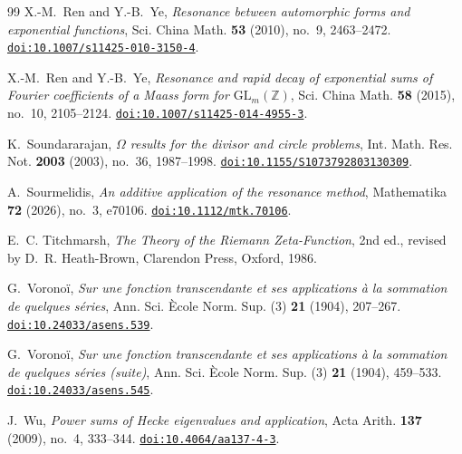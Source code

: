 \documentclass[11pt]{amsart}
\theoremstyle{plain}
\theoremstyle{definition}
\theoremstyle{remark}
\newcommand{\doi}[1]{\href{https://doi.org/#1}{\nolinkurl{doi:#1}}}
\numberwithin{equation}{section}
\begin{document}
\begin{thebibliography}{99}
X.-M.~Ren and Y.-B.~Ye,
\emph{Resonance between automorphic forms and exponential functions},
Sci. China Math. \textbf{53} (2010), no.~9, 2463--2472.
\doi{10.1007/s11425-010-3150-4}.

X.-M.~Ren and Y.-B.~Ye,
\emph{Resonance and rapid decay of exponential sums of Fourier
coefficients of a Maass form for
$\mathrm{GL}_m(\mathbb Z)$},
Sci. China Math. \textbf{58} (2015), no.~10, 2105--2124.
\doi{10.1007/s11425-014-4955-3}.

K.~Soundararajan,
\emph{$\Omega$ results for the divisor and circle problems},
Int. Math. Res. Not. \textbf{2003} (2003), no.~36, 1987--1998.
\doi{10.1155/S1073792803130309}.

A.~Sourmelidis,
\emph{An additive application of the resonance method},
Mathematika \textbf{72} (2026), no.~3, e70106.
\doi{10.1112/mtk.70106}.

E.~C. Titchmarsh,
\emph{The Theory of the Riemann Zeta-Function},
2nd ed., revised by D.~R. Heath-Brown,
Clarendon Press, Oxford, 1986.

G.~Vorono\"i,
\emph{Sur une fonction transcendante et ses applications \`a la sommation de quelques s\'eries},
Ann. Sci. \`Ecole Norm. Sup. (3) \textbf{21} (1904), 207--267.
\doi{10.24033/asens.539}.

G.~Vorono\"i,
\emph{Sur une fonction transcendante et ses applications \`a la sommation de quelques s\'eries (suite)},
Ann. Sci. \`Ecole Norm. Sup. (3) \textbf{21} (1904), 459--533.
\doi{10.24033/asens.545}.

J.~Wu,
\emph{Power sums of Hecke eigenvalues and application},
Acta Arith. \textbf{137} (2009), no.~4, 333--344.
\doi{10.4064/aa137-4-3}.

\end{thebibliography}
\end{document}
